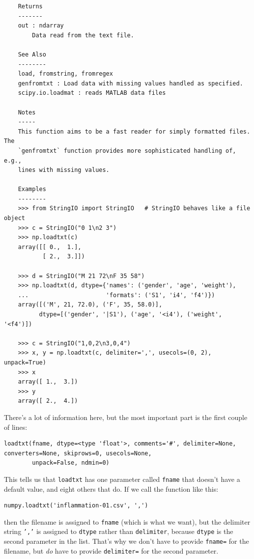 \documentclass[]{book}
\begin{document}
\begin{verbatim}
    Returns
    -------
    out : ndarray
        Data read from the text file.

    See Also
    --------
    load, fromstring, fromregex
    genfromtxt : Load data with missing values handled as specified.
    scipy.io.loadmat : reads MATLAB data files

    Notes
    -----
    This function aims to be a fast reader for simply formatted files.  The
    `genfromtxt` function provides more sophisticated handling of, e.g.,
    lines with missing values.

    Examples
    --------
    >>> from StringIO import StringIO   # StringIO behaves like a file object
    >>> c = StringIO("0 1\n2 3")
    >>> np.loadtxt(c)
    array([[ 0.,  1.],
           [ 2.,  3.]])

    >>> d = StringIO("M 21 72\nF 35 58")
    >>> np.loadtxt(d, dtype={'names': ('gender', 'age', 'weight'),
    ...                      'formats': ('S1', 'i4', 'f4')})
    array([('M', 21, 72.0), ('F', 35, 58.0)],
          dtype=[('gender', '|S1'), ('age', '<i4'), ('weight', '<f4')])

    >>> c = StringIO("1,0,2\n3,0,4")
    >>> x, y = np.loadtxt(c, delimiter=',', usecols=(0, 2), unpack=True)
    >>> x
    array([ 1.,  3.])
    >>> y
    array([ 2.,  4.])
\end{verbatim}

There's a lot of information here, but the most important part is the
first couple of lines:

\begin{verbatim}
loadtxt(fname, dtype=<type 'float'>, comments='#', delimiter=None, converters=None, skiprows=0, usecols=None,
        unpack=False, ndmin=0)
\end{verbatim}

This tells us that \texttt{loadtxt} has one parameter called
\texttt{fname} that doesn't have a default value, and eight others that
do. If we call the function like this:

\begin{verbatim}
numpy.loadtxt('inflammation-01.csv', ',')
\end{verbatim}

then the filename is assigned to \texttt{fname} (which is what we want),
but the delimiter string \texttt{','} is assigned to \texttt{dtype}
rather than \texttt{delimiter}, because \texttt{dtype} is the second
parameter in the list. That's why we don't have to provide
\texttt{fname=} for the filename, but \emph{do} have to provide
\texttt{delimiter=} for the second parameter.
\end{document}
